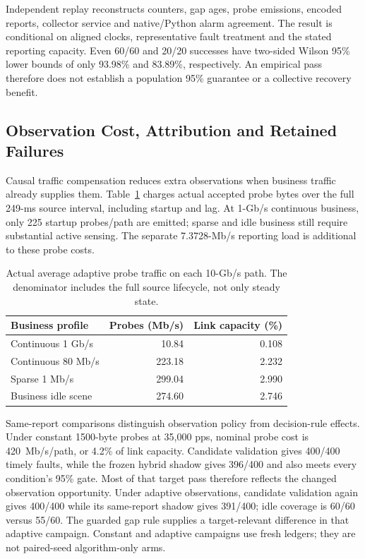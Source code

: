 \documentclass[sigconf]{acmart}
\begin{document}
Independent replay reconstructs counters, gap ages, probe emissions,
encoded reports, collector service and native/Python alarm agreement.
The result is conditional on aligned clocks, representative fault treatment
and the stated reporting capacity. Even 60/60 and 20/20 successes have
two-sided Wilson 95\% lower bounds of only 93.98\% and 83.89\%, respectively.
An empirical pass therefore does not establish a population 95\% guarantee
or a collective recovery benefit.

\subsection{Observation Cost, Attribution and Retained Failures}
\label{sec:attribution}
Causal traffic compensation reduces extra observations when business traffic
already supplies them. Table~\ref{tab:probe-cost} charges actual accepted
probe bytes over the full 249-ms source interval, including startup and lag.
At 1-Gb/s continuous business, only 225 startup probes/path are emitted;
sparse and idle business still require substantial active sensing. The
separate 7.3728-Mb/s reporting load is additional to these probe costs.

\begin{table}[t]
\caption{Actual average adaptive probe traffic on each 10-Gb/s path.
The denominator includes the full source lifecycle, not only steady state.}
\label{tab:probe-cost}
\centering\small
\begin{tabular}{@{}lrr@{}}
\toprule
Business profile & Probes (Mb/s) & Link capacity (\%)\\
\midrule
Continuous 1 Gb/s & 10.84 & 0.108\\
Continuous 80 Mb/s & 223.18 & 2.232\\
Sparse 1 Mb/s & 299.04 & 2.990\\
Business idle scene & 274.60 & 2.746\\
\bottomrule
\end{tabular}
\end{table}

Same-report comparisons distinguish observation policy from decision-rule
effects. Under constant 1500-byte probes at 35,000 pps, nominal probe cost is
420~Mb/s/path, or 4.2\% of link capacity. Candidate validation gives 400/400
timely faults, while the frozen hybrid shadow gives 396/400 and also meets
every condition's 95\% gate. Most of that target pass therefore reflects the
changed observation opportunity. Under adaptive observations, candidate
validation again gives 400/400 while its same-report shadow gives 391/400;
idle coverage is 60/60 versus 55/60. The guarded gap rule supplies a
target-relevant difference in that adaptive campaign. Constant and adaptive
campaigns use fresh ledgers; they are not paired-seed algorithm-only arms.
\end{document}
